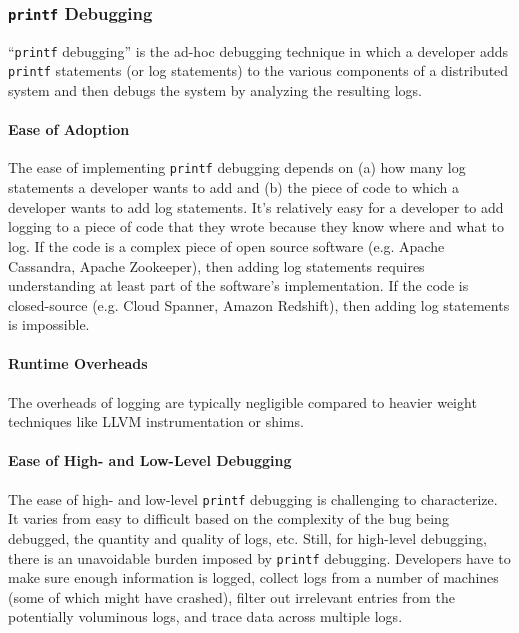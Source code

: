 \newcommand{\printf}{\texttt{printf}}
\subsubsection{\printf{} Debugging}
``\printf{} debugging'' is the ad-hoc debugging technique in which a developer
adds \printf{} statements (or log statements) to the various components of a
distributed system and then debugs the system by analyzing the resulting logs.

\paragraph{Ease of Adoption}
The ease of implementing \printf{} debugging depends on (a) how many log
statements a developer wants to add and (b) the piece of code to which a
developer wants to add log statements. It's relatively easy for a developer to
add logging to a piece of code that they wrote because they know where and what
to log. If the code is a complex piece of open source software (e.g. Apache
Cassandra, Apache Zookeeper), then adding log statements requires understanding
at least part of the software's implementation. If the code is closed-source
(e.g. Cloud Spanner, Amazon Redshift), then adding log statements is
impossible.

\paragraph{Runtime Overheads}
The overheads of logging are typically negligible compared to heavier weight
techniques like LLVM instrumentation or \fluent{} shims.

\paragraph{Ease of High- and Low-Level Debugging}
The ease of high- and low-level \printf{} debugging is challenging to
characterize. It varies from easy to difficult based on the complexity of the
bug being debugged, the quantity and quality of logs, etc. Still, for
high-level debugging, there is an unavoidable burden imposed by \printf{}
debugging. Developers have to make sure enough information is logged, collect
logs from a number of machines (some of which might have crashed), filter out
irrelevant entries from the potentially voluminous logs, and trace data across
multiple logs.

\subsubsection{\fluent{}}
